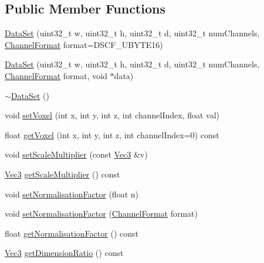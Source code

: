 \subsection*{\-Public \-Member \-Functions}
\begin{DoxyCompactItemize}
\item 
\hyperlink{class_verdi_1_1_data_set_ac1b89c64959ece72d5d973bd801abb33}{\-Data\-Set} (uint32\-\_\-t w, uint32\-\_\-t h, uint32\-\_\-t d, uint32\-\_\-t num\-Channels, \hyperlink{class_verdi_1_1_data_set_abd6d238fa4dff1b0ea6abd391d14ed64}{\-Channel\-Format} format=\-D\-S\-C\-F\-\_\-\-U\-B\-Y\-T\-E16)
\item 
\hyperlink{class_verdi_1_1_data_set_af840d791fe8ebb0d2347bba048f7482f}{\-Data\-Set} (uint32\-\_\-t w, uint32\-\_\-t h, uint32\-\_\-t d, uint32\-\_\-t num\-Channels, \hyperlink{class_verdi_1_1_data_set_abd6d238fa4dff1b0ea6abd391d14ed64}{\-Channel\-Format} format, void $\ast$data)
\item 
\hyperlink{class_verdi_1_1_data_set_a4641e0884e04506c10c09cbf100c6be3}{$\sim$\-Data\-Set} ()
\item 
void \hyperlink{class_verdi_1_1_data_set_a23e64c8d69ffc71fece6418588f65dde}{set\-Voxel} (int x, int y, int z, int channel\-Index, float val)
\item 
float \hyperlink{class_verdi_1_1_data_set_affc026d4fe5d9fc9131ff3f6a85dfa62}{get\-Voxel} (int x, int y, int z, int channel\-Index=0) const 
\item 
void \hyperlink{class_verdi_1_1_data_set_a04c0d346a813ee2d03f07520857cedc1}{set\-Scale\-Multiplier} (const \hyperlink{class_verdi_1_1_vec3}{\-Vec3} \&v)
\item 
\hyperlink{class_verdi_1_1_vec3}{\-Vec3} \hyperlink{class_verdi_1_1_data_set_ac3f633322a8d9d5cab9de79437bc5706}{get\-Scale\-Multiplier} () const 
\item 
void \hyperlink{class_verdi_1_1_data_set_a7485497199731cf7826220c87ca6eed5}{set\-Normalisation\-Factor} (float n)
\item 
void \hyperlink{class_verdi_1_1_data_set_a412db1524e144836d59a60a200c7692b}{set\-Normalisation\-Factor} (\hyperlink{class_verdi_1_1_data_set_abd6d238fa4dff1b0ea6abd391d14ed64}{\-Channel\-Format} format)
\item 
float \hyperlink{class_verdi_1_1_data_set_a6c29d92388f307ce51652e2c2ec6795a}{get\-Normalisation\-Factor} () const 
\item 
\hyperlink{class_verdi_1_1_vec3}{\-Vec3} \hyperlink{class_verdi_1_1_data_set_a5125c1de8c64c50b8e046ef31d637008}{get\-Dimension\-Ratio} () const 

\end{DoxyCompactItemize}

